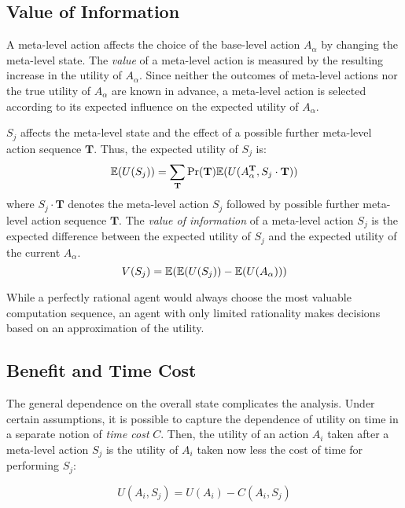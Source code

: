\subsection{Value of Information}
\label{sec:ratimeta-voi}

A meta-level action affects the choice of the base-level action
$A_\alpha$ by changing the meta-level state.
The {\em value} of a meta-level action is measured by the
resulting increase in the utility of $A_\alpha$. Since neither the
outcomes of meta-level actions nor the true utility of $A_\alpha$ are
known in advance, a meta-level action is selected according to its
expected influence on the expected utility of $A_\alpha$.

$S_j$ affects the meta-level state and the effect of
a possible further meta-level action sequence $\mathbf{T}$. Thus, the expected utility of
$S_j$ is:
\begin{equation}
\label{eq:bg-limited-su}
\mathbb{E}(U(S_j))=\sum_{\mathbf{T}}\Pr(\mathbf{T})\mathbb{E}(U(A_{\alpha}^\mathbf{T},S_j\cdot\mathbf{T}))
\end{equation}
where $S_j\cdot\mathbf{T}$ denotes the meta-level action $S_j$
followed by possible further meta-level action sequence $\mathbf{T}$.
The {\em value of information} of a meta-level action $S_j$ is
the expected difference between the expected utility of $S_j$ and the
expected utility of the current $A_\alpha$.
\begin{equation}
\label{eq:bg-limited-nv}
V(S_j)=\mathbb{E}(\mathbb{E}(U(S_j))-\mathbb{E}(U(A_\alpha)))
\end{equation}

While a perfectly rational agent would always choose the most valuable
computation sequence, an agent with only limited rationality makes
decisions based on an approximation of the utility.

\subsection{Benefit and Time Cost}
\label{sec:ratimeta-benefit-timecost}

The general dependence on the overall state complicates the analysis. Under
certain assumptions, it is possible to capture the dependence of utility on time in a
separate notion of {\em time cost} $C$. Then, the utility of an action $A_i$ taken
 after a meta-level action $S_j$ is the utility of $A_i$ taken now less the
cost of time for performing $S_j$:

\begin{equation}
\label{eq:bg-limited-iu}
U(A_i, S_j) = U(A_i) - C(A_i, S_j)
\end{equation}

